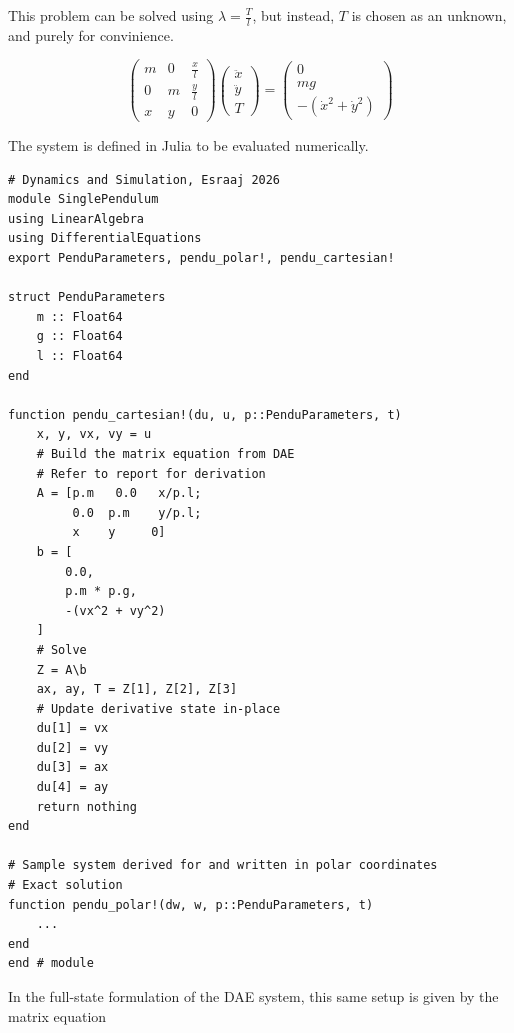 This problem can be solved using $\lambda = \frac{T}{l}$, but instead, $T$ is chosen as an unknown, and purely for convinience.

\begin{equation}
    \begin{pmatrix}
        m & 0 & \frac{x}{l} \\
        0 & m & \frac{y}{l} \\
        x & y & 0
    \end{pmatrix}
    \begin{pmatrix}
        \ddot{x} \\
        \ddot{y} \\
        T
    \end{pmatrix}
    =
    \begin{pmatrix}
        0  \\
        mg \\
        -\left(\dot{x}^2 + \dot{y}^2\right)
    \end{pmatrix}
\end{equation}

The system is defined in Julia to be evaluated numerically.

\begin{verbatim}
# Dynamics and Simulation, Esraaj 2026
module SinglePendulum
using LinearAlgebra
using DifferentialEquations
export PenduParameters, pendu_polar!, pendu_cartesian!

struct PenduParameters
    m :: Float64
    g :: Float64
    l :: Float64
end

function pendu_cartesian!(du, u, p::PenduParameters, t)
    x, y, vx, vy = u
    # Build the matrix equation from DAE
    # Refer to report for derivation
    A = [p.m   0.0   x/p.l;
         0.0  p.m    y/p.l;
         x    y     0]
    b = [
        0.0,
        p.m * p.g,
        -(vx^2 + vy^2)
    ]
    # Solve
    Z = A\b
    ax, ay, T = Z[1], Z[2], Z[3]
    # Update derivative state in-place
    du[1] = vx
    du[2] = vy
    du[3] = ax
    du[4] = ay
    return nothing
end

# Sample system derived for and written in polar coordinates
# Exact solution
function pendu_polar!(dw, w, p::PenduParameters, t)
    ...
end
end # module
\end{verbatim}

In the full-state formulation of the DAE system, this same setup is given by the matrix equation 

